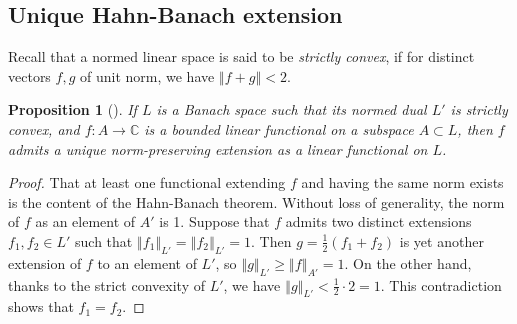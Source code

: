 \documentclass[letterpaper,11pt,reqno]{amsart}
\theoremstyle{plain}
\newtheorem{proposition}[equation]{Proposition}
\theoremstyle{definition}
\theoremstyle{remark}
\theoremstyle{remark}
\numberwithin{equation}{section}
\newcommand{\norm}[1]{\left\Vert#1\right\Vert}
\newcommand{\cx}{{\mathbb C}}
\begin{document}
\subsection{Unique Hahn-Banach extension}  
Recall that a normed linear space is  said to be {\em strictly convex}, if for distinct vectors $f,g$ of unit norm, we have $\norm{f+g} < 2$.
\begin{proposition}[\cite{taylor}]\label{prop-taylor} 
If $L$ is a Banach space such that its normed dual $L'$ is strictly convex, and $f:A\to \cx$ is a bounded linear functional on a subspace $A\subset L$, then $f$ admits a {\em unique} norm-preserving extension as a linear functional on $L$.
\end{proposition}
\begin{proof}
That at least one functional extending $f$ and having the same norm exists is the content of the Hahn-Banach theorem. 
Without loss of generality, the norm of $f$ as an element of $A'$ is 1. 
Suppose that $f$ admits two distinct extensions $f_1, f_2\in L'$ such that $\norm{f_1}_{L'}=\norm{f_2}_{L'}=1$. 
Then $g=\frac{1}{2}(f_1+f_2)$ is yet another extension of $f$ to an element of $L'$, so $\norm{g}_{L'}\geq \norm{f}_{A'}=1$. 
On the other hand, thanks  to the strict convexity of $L'$, we have $\norm{g}_{L'}< \frac{1}{2}\cdot 2 =1$. This contradiction shows that $f_1=f_2$.
\end{proof}
\end{document}
